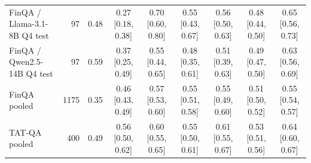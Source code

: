 \begin{tabular}{@{}l r r cccccc@{}}
FinQA / Llama-3.1-8B Q4 test & 97 & 0.48 & 0.27 \small[0.18, 0.38] & 0.70 \small[0.60, 0.80] & 0.55 \small[0.43, 0.67] & 0.56 \small[0.50, 0.63] & 0.48 \small[0.44, 0.50] & 0.65 \small[0.56, 0.73] \\
FinQA / Qwen2.5-14B Q4 test & 97 & 0.59 & 0.37 \small[0.25, 0.49] & 0.55 \small[0.44, 0.65] & 0.48 \small[0.35, 0.61] & 0.51 \small[0.39, 0.63] & 0.49 \small[0.47, 0.50] & 0.63 \small[0.56, 0.69] \\
\midrule
FinQA pooled & 1175 & 0.35 & 0.46 \small[0.43, 0.49] & 0.57 \small[0.53, 0.60] & 0.55 \small[0.51, 0.58] & 0.55 \small[0.49, 0.60] & 0.51 \small[0.50, 0.52] & 0.55 \small[0.54, 0.57] \\
\midrule
TAT-QA pooled & 400 & 0.49 & 0.56 \small[0.50, 0.62] & 0.60 \small[0.55, 0.65] & 0.55 \small[0.50, 0.61] & 0.61 \small[0.55, 0.67] & 0.53 \small[0.51, 0.56] & 0.64 \small[0.60, 0.67] \\
\bottomrule
\end{tabular}